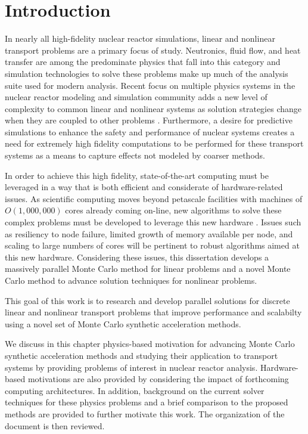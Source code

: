 \chapter{Introduction}
\label{ch:introduction}
In nearly all high-fidelity nuclear reactor simulations, linear and
nonlinear transport problems are a primary focus of study. Neutronics,
fluid flow, and heat transfer are among the predominate physics that
fall into this category and simulation technologies to solve these
problems make up much of the analysis suite used for modern
analysis. Recent focus on multiple physics systems in the nuclear
reactor modeling and simulation community adds a new level of
complexity to common linear and nonlinear systems as solution
strategies change when they are coupled to other problems
\citep{u.s._department_of_energy_casl_2011}. Furthermore, a desire for
predictive simulations to enhance the safety and performance of
nuclear systems creates a need for extremely high fidelity
computations to be performed for these transport systems as a means to
capture effects not modeled by coarser methods.

In order to achieve this high fidelity, state-of-the-art computing
 must be leveraged in a way that is both efficient
and considerate of hardware-related issues. As scientific computing
moves beyond petascale facilities with machines of $O(1,000,000)$
cores already coming on-line, new algorithms to solve these complex
problems must be developed to leverage this new hardware
\citep{kogge_using_2011}. Issues such as resiliency to node failure,
limited growth of memory available per node, and scaling to large
numbers of cores will be pertinent to robust algorithms aimed at this
new hardware. Considering these issues, this dissertation develops a
massively parallel Monte Carlo method for linear problems and a novel
Monte Carlo method to advance solution techniques for nonlinear
problems.

This goal of this work is to research and develop parallel solutions
for discrete linear and nonlinear transport problems that improve
performance and scalabilty using a novel set of Monte Carlo synthetic
acceleration methods.

We discuss in this chapter physics-based motivation for advancing
Monte Carlo synthetic acceleration methods and studying their
application to transport systems by providing problems of interest in
nuclear reactor analysis. Hardware-based motivations are also provided
by considering the impact of forthcoming computing architectures. In
addition, background on the current solver techniques for these
physics problems and a brief comparison to the proposed methods are
provided to further motivate this work. The organization of the
document is then reviewed.

